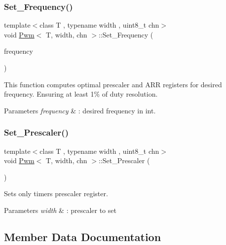 \subsubsection{\texorpdfstring{Set\_Frequency()}{Set\_Frequency()}}
{\footnotesize\ttfamily template$<$class T , typename width , uint8\+\_\+t chn$>$ \\
void \mbox{\hyperlink{class_pwm}{Pwm}}$<$ T, width, chn $>$\+::Set\+\_\+\+Frequency (\begin{DoxyParamCaption}\item[{uint32\+\_\+t}]{frequency }\end{DoxyParamCaption})\hspace{0.3cm}{\ttfamily [inline]}}



This function computes optimal prescaler and A\+RR registers for desired frequency. Ensuring at least 1\% of duty resolution. 


\begin{DoxyParams}{Parameters}
{\em frequency} & \+: desired frequency in int. \\
\hline
\end{DoxyParams}
\mbox{\label{class_pwm_acfe533cd832faefcec2c86a473e4f130}} 
\subsubsection{\texorpdfstring{Set\_Prescaler()}{Set\_Prescaler()}}
{\footnotesize\ttfamily template$<$class T , typename width , uint8\+\_\+t chn$>$ \\
void \mbox{\hyperlink{class_pwm}{Pwm}}$<$ T, width, chn $>$\+::Set\+\_\+\+Prescaler (\begin{DoxyParamCaption}\item[{width}]{ }\end{DoxyParamCaption})}



Sets only timer\textquotesingle{}s prescaler register. 


\begin{DoxyParams}{Parameters}
{\em width} & \+: prescaler to set \\
\hline
\end{DoxyParams}


\subsection{Member Data Documentation}
\mbox{\label{class_pwm_a2aa2d31eb683e2100620809fa253a25a}} 
